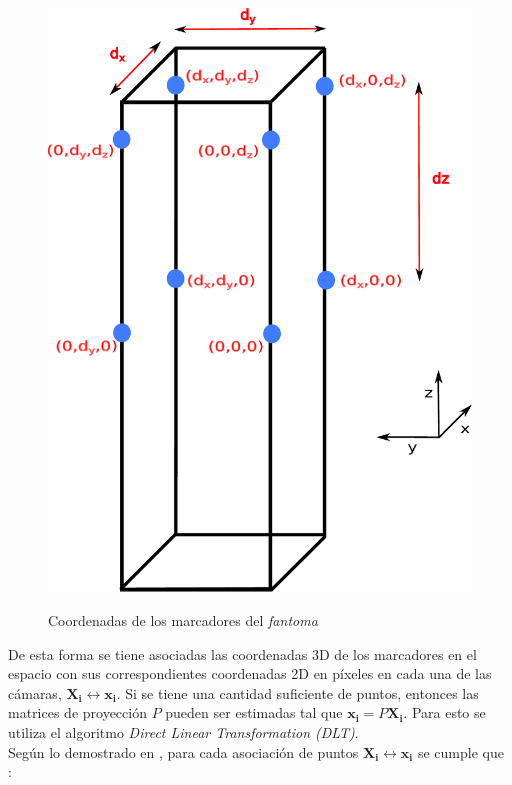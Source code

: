 \vspace{-0.53cm}
\begin{figure}[ht!]
        \centering
     {\includegraphics[scale=0.38]{img/calibracion/medidas_calibrador.pdf}}    
     \caption{Coordenadas de los marcadores del \textit{fantoma}}
      \label{fig: medidas_calibrador}     
\end{figure}

  De esta forma se tiene asociadas las coordenadas 3D de los marcadores en el espacio con sus correspondientes coordenadas 2D en píxeles en cada una de las cámaras, $\mathbf{X_i} \leftrightarrow  \mathbf{x_i}$. Si se tiene una cantidad suficiente de puntos, entonces las matrices de proyección $P$ pueden ser estimadas tal que $\mathbf{x_i}=P\mathbf{X_i}$. Para esto se utiliza el algoritmo \textit{Direct Linear Transformation (DLT)}.\\
   
 Según lo demostrado en \cite{hartley}, para cada asociación de puntos $\mathbf{X_i} \leftrightarrow \mathbf{x_i}$ se cumple que :
   
